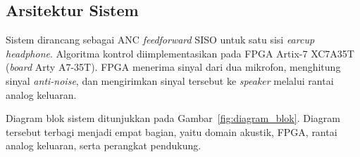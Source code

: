 \subsection{Arsitektur Sistem}
\label{sec:arsitektur}

Sistem dirancang sebagai ANC \emph{feedforward} SISO untuk satu sisi \emph{earcup} \emph{headphone}. Algoritma kontrol diimplementasikan pada FPGA Artix-7 XC7A35T (\emph{board} Arty A7-35T). FPGA menerima sinyal dari dua mikrofon, menghitung sinyal \emph{anti-noise}, dan mengirimkan sinyal tersebut ke \emph{speaker} melalui rantai analog keluaran.

Diagram blok sistem ditunjukkan pada Gambar~\ref{fig:diagram_blok}. Diagram tersebut terbagi menjadi empat bagian, yaitu domain akustik, FPGA, rantai analog keluaran, serta perangkat pendukung.

